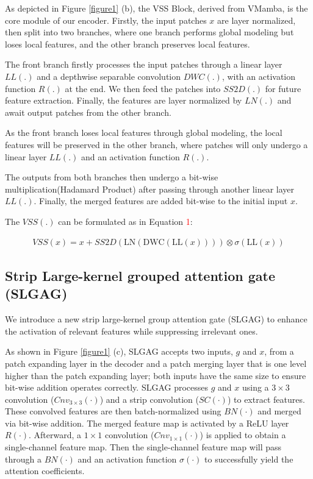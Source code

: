 \documentclass[10pt, a4paper, twocolumn]{article}
\begin{document}
As depicted in Figure \textcolor{red}{\ref{figure1}} (b), the VSS Block, derived from VMamba\cite{zhu2024vim,liu2024vmamba}, is the core module of our encoder. Firstly, the input patches $x$ are layer normalized, then split into two branches, where one branch performs global modeling but loses local features, and the other branch preserves local features.

The front branch firstly processes the input patches through a linear layer $LL(.)$ and a depthwise separable convolution $DWC(.)$, with an activation function $R(.)$ at the end. We then feed the patches into $SS2D(.)$ for future feature extraction. Finally, the features are layer normalized by $LN(.)$ and await output patches from the other branch.

As the front branch loses local features through global modeling, the local features will be preserved in the other branch, where patches will only undergo a linear layer $LL(.)$ and an activation function $R(.)$.

The outputs from both branches then undergo a bit-wise multiplication(Hadamard Product) after passing through another linear layer $LL(.)$. Finally, the merged features are added bit-wise to the initial input $x$.

The $VSS(.)$ can be formulated as in Equation \textcolor{red}{1}:
\begin{scriptsize} 
\begin{align} 
  VSS(x) = x + SS2D\left(\text{LN}\left(\text{DWC}\left(\text{LL}(x)\right)\right)\right) \otimes \sigma\left(\text{LL}(x)\right)
\end{align} 
\end{scriptsize}



\subsection{Strip Large-kernel grouped attention gate (SLGAG)}

We introduce a new strip large-kernel group attention gate (SLGAG) to enhance the activation of relevant features while suppressing irrelevant ones. 

As shown in Figure \textcolor{red}{\ref{figure1}} (c), SLGAG accepts two inputs, $g$ and $x$, from a patch expanding layer in the decoder and a patch merging layer that is one level higher than the patch expanding layer; both inputs have the same size to ensure bit-wise addition operates correctly. SLGAG processes $g$ and $x$ using a $3 \times 3$ convolution ($Cnv_{3\times 3}(\cdot)$) and a strip convolution ($SC(\cdot)$) to extract features. These convolved features are then batch-normalized using $BN(\cdot)$ and merged via bit-wise addition. The merged feature map is activated by a ReLU layer $R(\cdot)$. Afterward, a $1 \times 1$ convolution ($Cnv_{1\times 1}(\cdot)$) is applied to obtain a single-channel feature map. Then the single-channel feature map will pass through a $BN(\cdot)$ and an activation function $\sigma(\cdot)$ to successfully yield the attention coefficients. 
\end{document}
